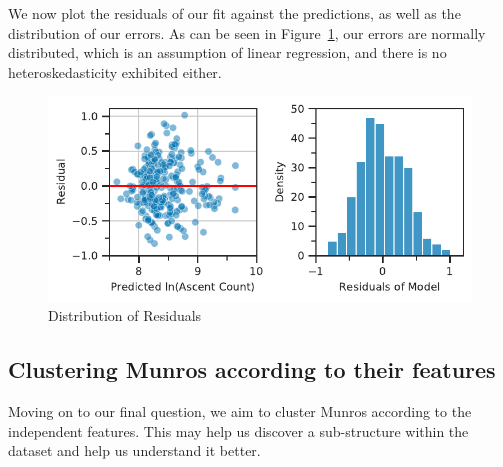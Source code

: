 \documentclass[11pt,a4paper]{article}
\begin{document}
We now plot the residuals of our fit against the predictions, as well as the distribution of our errors. As can be seen in Figure~\ref{fds-project-template:fig:multi_residuals_dist}, our errors are normally distributed, which is an assumption of linear regression, and there is no heteroskedasticity exhibited either.
\begin{figure} [h!]
  \centering
  \includegraphics{report/multi_residuals_dist.pdf}
  \caption{Distribution of Residuals}
  \label{fds-project-template:fig:multi_residuals_dist}
\end{figure}
\subsection{Clustering Munros according to their features}
Moving on to our final question, we aim to cluster Munros according to the independent features. This may help us discover a sub-structure within the dataset and help us understand it better.
\end{document}
